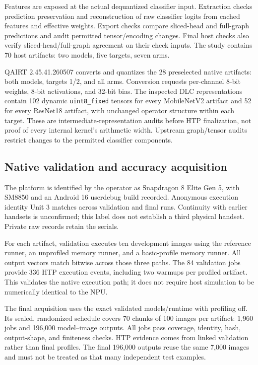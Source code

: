 \documentclass[10pt,twocolumn]{article}
\begin{document}
Features are exposed at the actual dequantized classifier input. Extraction checks prediction preservation and reconstruction of raw classifier logits from cached features and effective weights. Export checks compare sliced-head and full-graph predictions and audit permitted tensor/encoding changes. Final host checks also verify sliced-head/full-graph agreement on their check inputs. The study contains 70 host artifacts: two models, five targets, seven arms.

QAIRT 2.45.41.260507 converts and quantizes the 28 preselected native artifacts: both models, targets 1/2, and all arms. Conversion requests per-channel 8-bit weights, 8-bit activations, and 32-bit bias. The inspected DLC representations contain 102 dynamic \texttt{uint8\_fixed} tensors for every MobileNetV2 artifact and 52 for every ResNet18 artifact, with unchanged operator structure within each target. These are intermediate-representation audits before HTP finalization, not proof of every internal kernel's arithmetic width. Upstream graph/tensor audits restrict changes to the permitted classifier components.

\subsection{Native validation and accuracy acquisition}
The platform is identified by the operator as Snapdragon 8 Elite Gen 5, with SM8850 and an Android 16 userdebug build recorded. Anonymous execution identity Unit 3 matches across validation and final runs. Continuity with earlier handsets is unconfirmed; this label does not establish a third physical handset. Private raw records retain the serials.

For each artifact, validation executes ten development images using the reference runner, an unprofiled memory runner, and a basic-profile memory runner. All output vectors match bitwise across those three paths. The 84 validation jobs provide 336 HTP execution events, including two warmups per profiled artifact. This validates the native execution path; it does not require host simulation to be numerically identical to the NPU.

The final acquisition uses the exact validated models/runtime with profiling off. Its sealed, randomized schedule covers 70 chunks of 100 images per artifact: 1,960 jobs and 196,000 model--image outputs. All jobs pass coverage, identity, hash, output-shape, and finiteness checks. HTP evidence comes from linked validation rather than final profiles. The final 196,000 outputs reuse the same 7,000 images and must not be treated as that many independent test examples.
\end{document}
